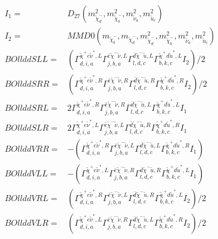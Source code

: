 \documentclass[A4,landscape]{article}
\begin{document}
\begin{align} 
I_1 = & D_{27}(m^2_{\tilde{\chi}^-_{{d}}}, m^2_{\tilde{\chi}^-_{{b}}}, m^2_{\tilde{\nu}_{{a}}}, m^2_{\tilde{u}_{{c}}}) \\ 
I_2 = & MMD0(m_{\tilde{\chi}^-_{{b}}}, m_{\tilde{\chi}^-_{{d}}}, m^2_{\tilde{\chi}^-_{{d}}}, m^2_{\tilde{\chi}^-_{{b}}}, m^2_{\tilde{\nu}_{{a}}}, m^2_{\tilde{u}_{{c}}}) \\ 
  BOllddSLL= & ( \Gamma^{\tilde{\chi}^+e \tilde{\nu}^*,L}_{d, i, a} \Gamma^{\bar{e}\tilde{\chi}^- \tilde{\nu} ,L}_{j, b, a} \Gamma^{\bar{d}\tilde{\chi}^- \tilde{u} ,L}_{l, d, c} \Gamma^{\tilde{\chi}^+d \tilde{u}^*,L}_{b, k, c} I_2)/2 \\ 
  BOllddSRR= & ( \Gamma^{\tilde{\chi}^+e \tilde{\nu}^*,R}_{d, i, a} \Gamma^{\bar{e}\tilde{\chi}^- \tilde{\nu} ,R}_{j, b, a} \Gamma^{\bar{d}\tilde{\chi}^- \tilde{u} ,R}_{l, d, c} \Gamma^{\tilde{\chi}^+d \tilde{u}^*,R}_{b, k, c} I_2)/2 \\ 
  BOllddSRL= & 2  \Gamma^{\tilde{\chi}^+e \tilde{\nu}^*,R}_{d, i, a} \Gamma^{\bar{e}\tilde{\chi}^- \tilde{\nu} ,R}_{j, b, a} \Gamma^{\bar{d}\tilde{\chi}^- \tilde{u} ,L}_{l, d, c} \Gamma^{\tilde{\chi}^+d \tilde{u}^*,L}_{b, k, c} I_1 \\ 
  BOllddSLR= & 2  \Gamma^{\tilde{\chi}^+e \tilde{\nu}^*,L}_{d, i, a} \Gamma^{\bar{e}\tilde{\chi}^- \tilde{\nu} ,L}_{j, b, a} \Gamma^{\bar{d}\tilde{\chi}^- \tilde{u} ,R}_{l, d, c} \Gamma^{\tilde{\chi}^+d \tilde{u}^*,R}_{b, k, c} I_1 \\ 
  BOllddVRR= & -( \Gamma^{\tilde{\chi}^+e \tilde{\nu}^*,R}_{d, i, a} \Gamma^{\bar{e}\tilde{\chi}^- \tilde{\nu} ,L}_{j, b, a} \Gamma^{\bar{d}\tilde{\chi}^- \tilde{u} ,L}_{l, d, c} \Gamma^{\tilde{\chi}^+d \tilde{u}^*,R}_{b, k, c} I_1) \\ 
  BOllddVLL= & -( \Gamma^{\tilde{\chi}^+e \tilde{\nu}^*,L}_{d, i, a} \Gamma^{\bar{e}\tilde{\chi}^- \tilde{\nu} ,R}_{j, b, a} \Gamma^{\bar{d}\tilde{\chi}^- \tilde{u} ,R}_{l, d, c} \Gamma^{\tilde{\chi}^+d \tilde{u}^*,L}_{b, k, c} I_1) \\ 
  BOllddVRL= & ( \Gamma^{\tilde{\chi}^+e \tilde{\nu}^*,R}_{d, i, a} \Gamma^{\bar{e}\tilde{\chi}^- \tilde{\nu} ,L}_{j, b, a} \Gamma^{\bar{d}\tilde{\chi}^- \tilde{u} ,R}_{l, d, c} \Gamma^{\tilde{\chi}^+d \tilde{u}^*,L}_{b, k, c} I_2)/2 \\ 
  BOllddVLR= & ( \Gamma^{\tilde{\chi}^+e \tilde{\nu}^*,L}_{d, i, a} \Gamma^{\bar{e}\tilde{\chi}^- \tilde{\nu} ,R}_{j, b, a} \Gamma^{\bar{d}\tilde{\chi}^- \tilde{u} ,L}_{l, d, c} \Gamma^{\tilde{\chi}^+d \tilde{u}^*,R}_{b, k, c} I_2)/2 \\ 

\end{align}
\end{document}
